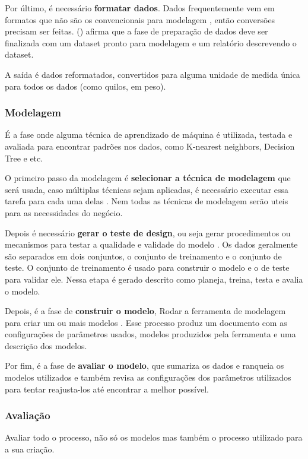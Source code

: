 Por último, é necessário \textbf{formatar dados}. Dados frequentemente vem em formatos que não são os convencionais para modelagem \citep{dmfd}, então conversões precisam ser feitas. \citeauthor{dmfd} (\citeyear{dmfd}) afirma que a fase de preparação de dados deve ser finalizada com um dataset pronto para modelagem e um relatório descrevendo o dataset.

A saída é dados reformatados, convertidos para alguma unidade de medida única para todos os dados (como quilos, em peso).

\subsubsection{Modelagem}
É a fase onde alguma técnica de aprendizado de máquina é utilizada, testada e avaliada para encontrar padrões nos dados, como K-nearest neighbors, Decision Tree e etc.

O primeiro passo da modelagem é \textbf{selecionar a técnica de modelagem} que será usada, caso múltiplas técnicas sejam aplicadas, é necessário executar essa tarefa para cada uma delas \citep{crispmanual}. Nem todas as técnicas de modelagem serão uteis para as necessidades do negócio.

Depois é necessário \textbf{gerar o teste de design}, ou seja gerar procedimentos ou mecanismos para testar a qualidade e validade do modelo \citep{crispmanual}. Os dados geralmente são separados em dois conjuntos, o conjunto de treinamento e o conjunto de teste. O conjunto de treinamento é usado para construir o modelo e o de teste para validar ele. Nessa etapa é gerado descrito como planeja, treina, testa e avalia o modelo.

Depois, é a fase de \textbf{construir o modelo}, Rodar a ferramenta de modelagem para criar um ou mais modelos \citep{crispmanual}. Esse processo produz um documento com as configurações de parâmetros usados, modelos produzidos pela ferramenta e uma descrição dos modelos.

Por fim, é a fase de \textbf{avaliar o modelo}, que sumariza os dados e ranqueia os modelos utilizados e também revisa as configurações dos parâmetros utilizados para tentar reajusta-los até encontrar a melhor possível.

\subsubsection{Avaliação}
Avaliar todo o processo, não só os modelos mas também o processo utilizado para a sua criação.

